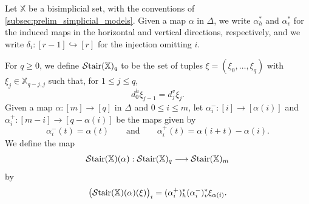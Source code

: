 \documentclass[10pt,reqno]{amsart}
\begin{document}
Let $\mathbb X$ be a bisimplicial set, with the conventions of
\cref{subsec:prelim_simplicial_models}. Given a map $\alpha$ in
$\Delta$, we write $\alpha_h^*$ and $\alpha_v^*$ for the induced
maps in the horizontal and vertical directions, respectively, and we
write $\delta_i:[r-1]\hookrightarrow[r]$ for the injection omitting
$i$.

\begin{construction}
\label{const:staircase_codiagonal}
For $q\geq 0$, we define $\mathcal{S}\mathrm{tair}(\mathbb X)_q$ to be the set of
tuples
$
\xi=(\xi_0,\ldots,\xi_q)
$
with
$
\xi_j\in\mathbb X_{q-j,j}
$
such that, for $1\leq j\leq q$,
\begin{equation}
\label{eq:staircase_relation}
d_0^h\xi_{j-1}=d_j^v\xi_j.
\end{equation}
Given a map $\alpha:[m]\to[q]$ in $\Delta$ and $0\leq i\leq m$,
let $\alpha_i^-:[i]\to[\alpha(i)]$ and
$\alpha_i^+:[m-i]\to[q-\alpha(i)]$ be the maps given by
\[
\alpha_i^-(t)=\alpha(t)
\qquad\text{and}\qquad
\alpha_i^+(t)=\alpha(i+t)-\alpha(i).
\]
We define the map
\[
\mathcal{S}\mathrm{tair}(\mathbb X)(\alpha):
\mathcal{S}\mathrm{tair}(\mathbb X)_q\longrightarrow\mathcal{S}\mathrm{tair}(\mathbb X)_m
\]
by
\begin{equation}
\label{eq:staircase_alpha}
\bigl(\mathcal{S}\mathrm{tair}(\mathbb X)(\alpha)(\xi)\bigr)_i
=
(\alpha_i^+)_{h}^{*}(\alpha_i^-)_{v}^{*}
\xi_{\alpha(i)}.
\end{equation}
\end{construction}
\end{document}
